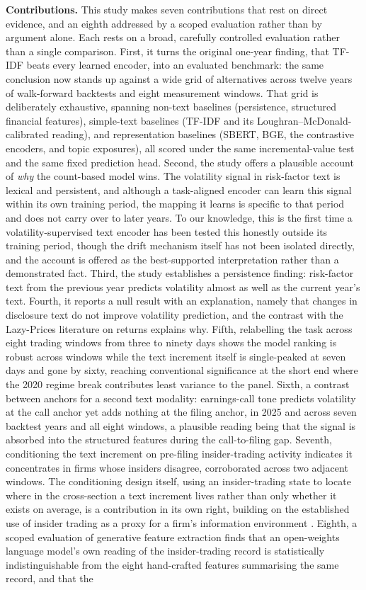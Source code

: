 \documentclass[logo,msc,ai]{infthesis}        %
\begin{document}
\textbf{Contributions.} This study makes seven contributions that rest on direct evidence, and an eighth addressed by a scoped evaluation rather than by argument alone. Each rests on a broad, carefully controlled evaluation rather than a single comparison. First, it turns the original one-year finding, that TF-IDF beats every learned encoder, into an evaluated benchmark: the same conclusion now stands up against a wide grid of alternatives across twelve years of walk-forward backtests and eight measurement windows. That grid is deliberately exhaustive, spanning non-text baselines (persistence, structured financial features), simple-text baselines (TF-IDF and its Loughran--McDonald-calibrated reading), and representation baselines (SBERT, BGE, the contrastive encoders, and topic exposures), all scored under the same incremental-value test and the same fixed prediction head. Second, the study offers a plausible account of \emph{why} the count-based model wins. The volatility signal in risk-factor text is lexical and persistent, and although a task-aligned encoder can learn this signal within its own training period, the mapping it learns is specific to that period and does not carry over to later years. To our knowledge, this is the first time a volatility-supervised text encoder has been tested this honestly outside its training period, though the drift mechanism itself has not been isolated directly, and the account is offered as the best-supported interpretation rather than a demonstrated fact. Third, the study establishes a persistence finding: risk-factor text from the previous year predicts volatility almost as well as the current year's text. Fourth, it reports a null result with an explanation, namely that changes in disclosure text do not improve volatility prediction, and the contrast with the Lazy-Prices literature on returns explains why. Fifth, relabelling the task across eight trading windows from three to ninety days shows the model ranking is robust across windows while the text increment itself is single-peaked at seven days and gone by sixty, reaching conventional significance at the short end where the 2020 regime break contributes least variance to the panel. Sixth, a contrast between anchors for a second text modality: earnings-call tone predicts volatility at the call anchor yet adds nothing at the filing anchor, in 2025 and across seven backtest years and all eight windows, a plausible reading being that the signal is absorbed into the structured features during the call-to-filing gap. Seventh, conditioning the text increment on pre-filing insider-trading activity indicates it concentrates in firms whose insiders disagree, corroborated across two adjacent windows. The conditioning design itself, using an insider-trading state to locate where in the cross-section a text increment lives rather than only whether it exists on average, is a contribution in its own right, building on the established use of insider trading as a proxy for a firm's information environment \cite{frankel2004characteristics}. Eighth, a scoped evaluation of generative feature extraction finds that an open-weights language model's own reading of the insider-trading record is statistically indistinguishable from the eight hand-crafted features summarising the same record, and that the 
\end{document}
